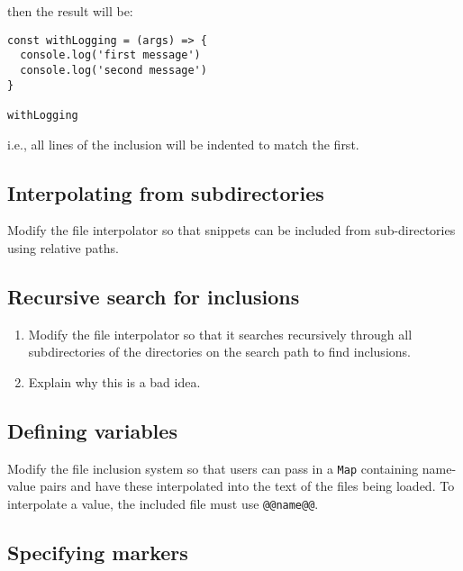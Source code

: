 \documentclass[krantzl]{krantz}
\begin{document}
\noindent then the result will be:

\begin{lstlisting}[frame=single,frameround=tttt]
const withLogging = (args) => {
  console.log('first message')
  console.log('second message')
}

withLogging
\end{lstlisting}


\noindent i.e., all lines of the inclusion will be indented to match the first.

\subsection*{Interpolating from subdirectories}


Modify the file interpolator so that snippets can be included from sub-directories using relative paths.

\subsection*{Recursive search for inclusions}

\begin{enumerate}

\item 

Modify the file interpolator so that it searches recursively
    through all subdirectories of the directories on the search path
    to find inclusions.



\item 

Explain why this is a bad idea.



\end{enumerate}

\subsection*{Defining variables}


Modify the file inclusion system so that users can pass in a \texttt{Map} containing name-value pairs
and have these interpolated into the text of the files being loaded.
To interpolate a value,
the included file must use \texttt{@@name@@}.

\subsection*{Specifying markers}
\end{document}
